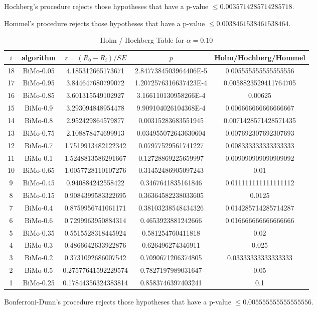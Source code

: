 \documentclass[a4paper,10pt]{article}
\begin{document}
\begin{landscape}
Hochberg's procedure rejects those hypotheses that have a p-value $\le0.0035714285714285718$.


Hommel's procedure rejects those hypotheses that have a p-value $\le0.0038461538461538464$.


\begin{table}[!htp]
\centering\tiny
\caption{Holm / Hochberg Table for $\alpha=0.10$}
\begin{tabular}{ccccc}
$i$&algorithm&$z=(R_0 - R_i)/SE$&$p$&Holm/Hochberg/Hommel\\
\hline
18&BiMo-0.05&4.185312665173671&2.8477384503964406E-5&0.005555555555555556\\
17&BiMo-0.95&3.844647680799072&1.2072576316637423E-4&0.0058823529411764705\\
16&BiMo-0.85&3.601315549102927&3.166110130958266E-4&0.00625\\
15&BiMo-0.9&3.293094848954478&9.909104026104368E-4&0.006666666666666667\\
14&BiMo-0.8&2.952429864579877&0.00315283683551945&0.0071428571428571435\\
13&BiMo-0.75&2.108878474699913&0.034955072643630604&0.007692307692307693\\
12&BiMo-0.7&1.7519913482122342&0.07977529561741227&0.008333333333333333\\
11&BiMo-0.1&1.5248813586291667&0.12728869225659997&0.009090909090909092\\
10&BiMo-0.65&1.0057728110107276&0.31452486905097243&0.01\\
9&BiMo-0.45&0.940884242558422&0.3467641835161846&0.011111111111111112\\
8&BiMo-0.15&0.9084399583322695&0.36364582238033605&0.0125\\
7&BiMo-0.4&0.8759956741061171&0.38103238548434326&0.014285714285714287\\
6&BiMo-0.6&0.7299963950884314&0.4653923881242666&0.016666666666666666\\
5&BiMo-0.35&0.5515528318445924&0.581254760411818&0.02\\
4&BiMo-0.3&0.4866642633922876&0.626496274346911&0.025\\
3&BiMo-0.2&0.3731092686007542&0.7090671206374805&0.03333333333333333\\
2&BiMo-0.5&0.27577641592229574&0.7827197989031647&0.05\\
1&BiMo-0.25&0.17844356324383814&0.8583746397403241&0.1\\
\hline
\end{tabular}
\end{table}
Bonferroni-Dunn's procedure rejects those hypotheses that have a p-value $\le0.005555555555555556$.



\end{landscape}
\end{document}
